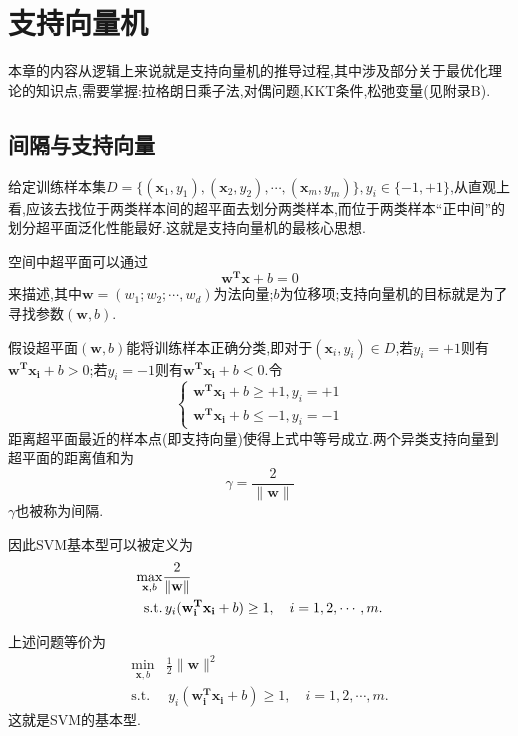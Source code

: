 \chapter{支持向量机}

本章的内容从逻辑上来说就是支持向量机的推导过程,其中涉及部分关于最优化理论的知识点,需要掌握:拉格朗日乘子法,对偶问题,KKT条件,松弛变量(见附录B).

\section{间隔与支持向量}

给定训练样本集$D=\{(\mathbf x_1, y_1),(\mathbf x_2, y_2),\cdots,(\mathbf x_m, y_m)\},y_i\in\{-1,+1\}$,从直观上看,应该去找位于两类样本间的超平面去划分两类样本,而位于两类样本``正中间''的划分超平面泛化性能最好.这就是支持向量机的最核心思想.

空间中超平面可以通过
\begin{equation}
\mathbf {w^Tx}+b=0
\end{equation}
来描述,其中$\mathbf w=(w_1;w_2;\cdots,w_d)$为法向量;$b$为位移项;支持向量机的目标就是为了寻找参数$(\mathbf w,b)$.

假设超平面$(\mathbf w,b)$能将训练样本正确分类,即对于$(\mathbf x_i,y_i)\in D$,若$y_i=+1$则有$\mathbf {w^Tx_i}+b>0$;若$y_i=-1$则有$\mathbf{w^Tx_i}+b<0$.令
\begin{equation}
\left\{
\begin{array}{ll}
\mathbf{w^Tx_i}+b\ge +1,y_i=+1 \\
\mathbf{w^Tx_i}+b\le -1,y_i=-1
\end{array}
\right.
\end{equation}
距离超平面最近的样本点(即支持向量)使得上式中等号成立.两个异类支持向量到超平面的距离值和为
\begin{equation}
\gamma=\frac{2}{\|\mathbf w\|}
\end{equation}
$\gamma$也被称为间隔.

因此SVM基本型可以被定义为
\begin{equation}\begin{split}
\max_{\mathbf x,b}&\frac{2}{\|\mathbf w\|} \\
\text{\text{s.t.}}& \,y_i(\mathbf{w_i^Tx_i}+b)\ge 1,\quad i=1,2,\cdots,m.
\end{split}\end{equation}

上述问题等价为
\begin{equation}\begin{split}
\min_{\mathbf x,b}&\frac{1}{2}\|\mathbf w\|^2 \\
\text{s.t.}& \,y_i(\mathbf{w_i^Tx_i}+b)\ge 1,\quad i=1,2,\cdots,m.
\end{split}\end{equation}
这就是SVM的基本型.

